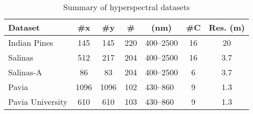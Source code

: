 \documentclass[journal,12pt,onecolumn, draft]{IEEEtran}
\begin{document}
\begin{table}[h!]
\centering
\caption{Summary of hyperspectral datasets}
\label{tab:datasets}
\begin{tabular}{lcccccc}
\hline
\textbf{Dataset} & \textbf{\#x} & \textbf{\#y} & \textbf{\#\bm{$\lambda$}} & \textbf{\bm{$\lambda$} (nm)} & \textbf{\#C} & \textbf{Res. (m)} \\
\hline
Indian Pines\footnotemark[1] & 145 & 145 & 220 & 400--2500 & 16 & 20 \\
Salinas\footnotemark[2] & 512 & 217 & 204 & 400--2500 & 16 & 3.7 \\
Salinas-A\footnotemark[2] & 86 & 83 & 204 & 400--2500 & 6 & 3.7 \\
Pavia\footnotemark[3] & 1096 & 1096 & 102 & 430--860~ & 9 & 1.3 \\
Pavia University\footnotemark[3] & 610 & 610 & 103 & 430--860~ & 9 & 1.3 \\
\hline
\end{tabular}
\end{table}
\end{document}
